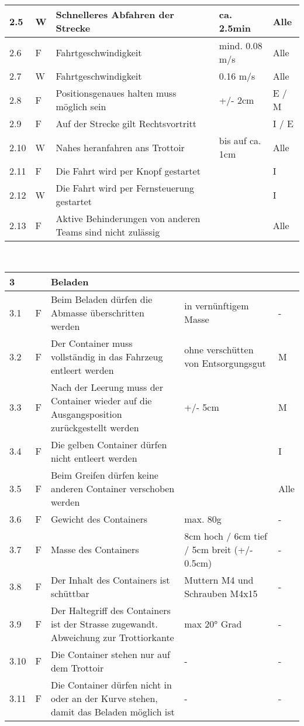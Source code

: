 \begin{center}
\begin{tabular}{|p{1cm}|p{0.5cm}|p{5cm}|p{5cm}|p{1.5cm}|}
 2.5 & W & Schnelleres Abfahren der Strecke & ca. 2.5min & Alle\\\hline
 2.6 & F & Fahrtgeschwindigkeit & mind. 0.08 m/s & Alle \\\hline
 2.7 & W & Fahrtgeschwindigkeit & 0.16 m/s & Alle \\\hline
 2.8 & F & Positionsgenaues halten muss möglich sein & +/- 2cm & E / M\\\hline
 2.9 & F & Auf der Strecke gilt Rechtsvortritt & & I / E \\\hline
 2.10 & W & Nahes heranfahren ans Trottoir & bis auf ca. 1cm & Alle\\\hline
 2.11 & F & Die Fahrt wird per Knopf gestartet & & I\\\hline
 2.12 & W & Die Fahrt wird per Fernsteuerung gestartet & & I \\\hline
 2.13 & F & Aktive Behinderungen von anderen Teams sind nicht zulässig & & Alle \\\hline
\end{tabular}\\[0.3cm]
\begin{tabular}{|p{1cm}|p{0.5cm}|p{5cm}|p{5cm}|p{1.5cm}|}\hline
 \textbf{3} & & \textbf{Beladen} & & \\\hline
 3.1 & F & Beim Beladen dürfen die Abmasse überschritten werden & in vernünftigem Masse & -\\\hline
 3.2 & F & Der Container muss vollständig in das Fahrzeug entleert werden & ohne verschütten von Entsorgungsgut & M\\\hline
 3.3 & F & Nach der Leerung muss der Container wieder auf die Ausgangsposition zurückgestellt werden & +/- 5cm & M\\\hline
 3.4 & F & Die gelben Container dürfen nicht entleert werden & & I\\\hline
 3.5 & F & Beim Greifen dürfen keine anderen Container verschoben werden & & Alle\\\hline
 3.6 & F & Gewicht des Containers & max. 80g & - \\\hline 
 3.7 & F & Masse des Containers& 8cm hoch  / 6cm tief / 5cm breit (+/- 0.5cm) & - \\\hline 
 3.8 & F & Der Inhalt des Containers ist schüttbar & Muttern M4 und Schrauben M4x15  & - \\\hline 
 3.9 & F & Der Haltegriff des Containers ist der Strasse zugewandt. Abweichung zur Trottiorkante & max 20° Grad  & - \\\hline 
 3.10 & F & Die Container stehen nur auf dem Trottoir & - & - \\\hline 
 3.11 & F & Die Container dürfen nicht in oder an der Kurve stehen, damit das Beladen möglich ist & - & - \\\hline 
\end{tabular}
\end{center}
